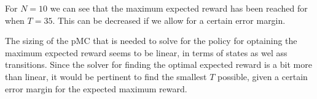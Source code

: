 For $N=10$ we can see that the maximum expected reward has been reached for when $T=35$. This can be decreased if we allow for a certain error margin.

The sizing of the pMC that is needed to solve for the policy for optaining the maximum expected reward seems to be linear, in terms of states as wel ass transitions. Since the solver for finding the optimal expected reward is a bit more than linear, it would be pertinent to find the smallest $T$ possible, given a certain error margin for the expected maximum reward.
